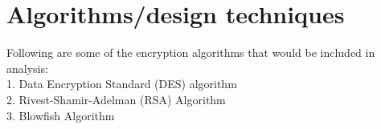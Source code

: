 \documentclass[a4paper]{article}
\begin{document}
\newpage 
\section{Algorithms/design techniques} %
Following are some of the encryption algorithms that would be included in analysis: \\
1. Data Encryption Standard (DES) algorithm\\ 
2. Rivest-Shamir-Adelman (RSA) Algorithm \\
3. Blowfish Algorithm \\






\end{document}
